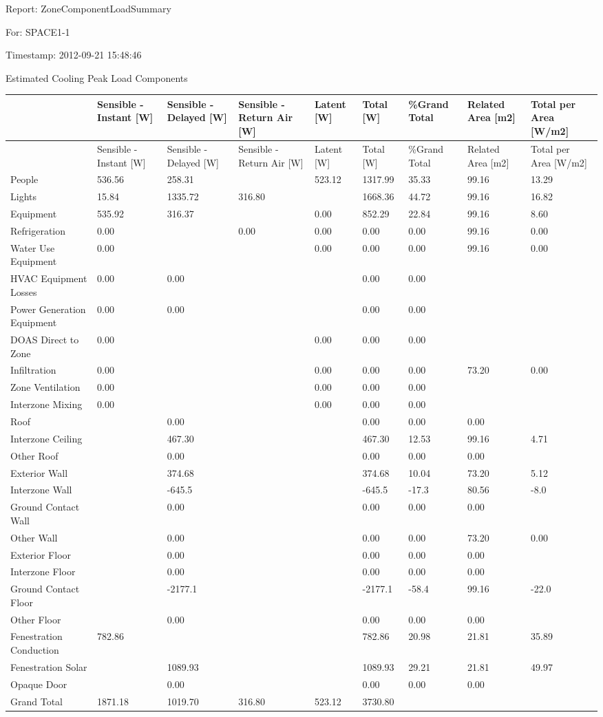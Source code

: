 Report: ZoneComponentLoadSummary

For: SPACE1-1

Timestamp: 2012-09-21 15:48:46

Estimated Cooling Peak Load Components
{\scriptsize

\begin{longtable}[c]{>{\raggedright}p{0.65in}>{\raggedright}p{0.65in}>{\raggedright}p{0.65in}>{\raggedright}p{0.65in}>{\raggedright}p{0.65in}>{\raggedright}p{0.65in}>{\raggedright}p{0.65in}>{\raggedright}p{0.65in}>{\raggedright}p{0.65in}}
\toprule
 & Sensible - Instant [W] & Sensible - Delayed [W] & Sensible - Return Air [W] & Latent [W] & Total [W] & \%Grand Total & Related Area {[}m2{]} & Total per Area {[}W/m2{]} \tabularnewline
\midrule
\endfirsthead

\toprule
 & Sensible - Instant [W] & Sensible - Delayed [W] & Sensible - Return Air [W] & Latent [W] & Total [W] & \%Grand Total & Related Area {[}m2{]} & Total per Area {[}W/m2{]} \tabularnewline
\midrule
\endhead

People & 536.56 & 258.31 &  & 523.12 & 1317.99 & 35.33 & 99.16 & 13.29 \tabularnewline
Lights & 15.84 & 1335.72 & 316.80 &  & 1668.36 & 44.72 & 99.16 & 16.82 \tabularnewline
Equipment & 535.92 & 316.37 &  & 0.00 & 852.29 & 22.84 & 99.16 & 8.60 \tabularnewline
Refrigeration & 0.00 &  & 0.00 & 0.00 & 0.00 & 0.00 & 99.16 & 0.00 \tabularnewline
Water Use Equipment & 0.00 &  &  & 0.00 & 0.00 & 0.00 & 99.16 & 0.00 \tabularnewline
HVAC Equipment Losses & 0.00 & 0.00 &  &  & 0.00 & 0.00 &  &  \tabularnewline
Power Generation Equipment & 0.00 & 0.00 &  &  & 0.00 & 0.00 &  &  \tabularnewline
DOAS Direct to Zone & 0.00 &  &  & 0.00 & 0.00 & 0.00 &  &  \tabularnewline
Infiltration & 0.00 &  &  & 0.00 & 0.00 & 0.00 & 73.20 & 0.00 \tabularnewline
Zone Ventilation & 0.00 &  &  & 0.00 & 0.00 & 0.00 &  &  \tabularnewline
Interzone Mixing & 0.00 &  &  & 0.00 & 0.00 & 0.00 &  &  \tabularnewline
Roof &  & 0.00 &  &  & 0.00 & 0.00 & 0.00 &  \tabularnewline
Interzone Ceiling &  & 467.30 &  &  & 467.30 & 12.53 & 99.16 & 4.71 \tabularnewline
Other Roof &  & 0.00 &  &  & 0.00 & 0.00 & 0.00 &  \tabularnewline
Exterior Wall &  & 374.68 &  &  & 374.68 & 10.04 & 73.20 & 5.12 \tabularnewline
Interzone Wall &  & -645.5 &  &  & -645.5 & -17.3 & 80.56 & -8.0 \tabularnewline
Ground Contact Wall &  & 0.00 &  &  & 0.00 & 0.00 & 0.00 &  \tabularnewline
Other Wall &  & 0.00 &  &  & 0.00 & 0.00 & 73.20 & 0.00 \tabularnewline
Exterior Floor &  & 0.00 &  &  & 0.00 & 0.00 & 0.00 &  \tabularnewline
Interzone Floor &  & 0.00 &  &  & 0.00 & 0.00 & 0.00 &  \tabularnewline
Ground Contact Floor &  & -2177.1 &  &  & -2177.1 & -58.4 & 99.16 & -22.0 \tabularnewline
Other Floor &  & 0.00 &  &  & 0.00 & 0.00 & 0.00 &  \tabularnewline
Fenestration Conduction & 782.86 &  &  &  & 782.86 & 20.98 & 21.81 & 35.89 \tabularnewline
Fenestration Solar &  & 1089.93 &  &  & 1089.93 & 29.21 & 21.81 & 49.97 \tabularnewline
Opaque Door &  & 0.00 &  &  & 0.00 & 0.00 & 0.00 &  \tabularnewline
Grand Total & 1871.18 & 1019.70 & 316.80 & 523.12 & 3730.80 &  &  &  \tabularnewline

\bottomrule
\end{longtable}}

